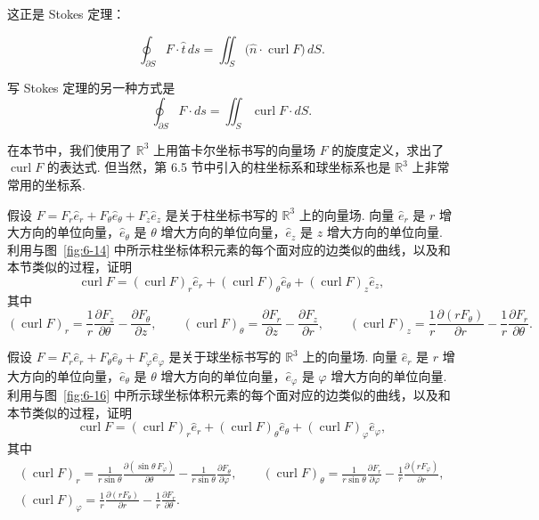 这正是 Stokes 定理：
\begin{theorem}[Stokes 定理]\label{thm:9-4}
\[
\oint_{\partial S}F\cdot\hat{t}\,ds=\iint_S\bigl(\hat{n}\cdot\operatorname{curl}F\bigr)\,dS.
\]
\end{theorem}

写 Stokes 定理的另一种方式是
\[
\oint_{\partial S}F\cdot ds=\iint_S\operatorname{curl}F\cdot dS.
\]

在本节中，我们使用了 $\mathbb{R}^3$ 上用笛卡尔坐标书写的向量场 $F$ 的旋度定义，求出了 $\operatorname{curl}F$ 的表达式. 但当然，第 6.5 节中引入的柱坐标系和球坐标系也是 $\mathbb{R}^3$ 上非常常用的坐标系.

\begin{question}\label{q:9-7}
假设 $F=F_r\hat{e}_r+F_\theta\hat{e}_\theta+F_z\hat{e}_z$ 是关于柱坐标书写的 $\mathbb{R}^3$ 上的向量场. 向量 $\hat{e}_r$ 是 $r$ 增大方向的单位向量，$\hat{e}_\theta$ 是 $\theta$ 增大方向的单位向量，$\hat{e}_z$ 是 $z$ 增大方向的单位向量. 利用与图~\ref{fig:6-14} 中所示柱坐标体积元素的每个面对应的边类似的曲线，以及和本节类似的过程，证明
\[
\operatorname{curl}F=(\operatorname{curl}F)_r\hat{e}_r+(\operatorname{curl}F)_\theta\hat{e}_\theta+(\operatorname{curl}F)_z\hat{e}_z,
\]
其中
\[
(\operatorname{curl}F)_r=\frac{1}{r}\frac{\partial F_z}{\partial\theta}-\frac{\partial F_\theta}{\partial z},\qquad
(\operatorname{curl}F)_\theta=\frac{\partial F_r}{\partial z}-\frac{\partial F_z}{\partial r},\qquad
(\operatorname{curl}F)_z=\frac{1}{r}\frac{\partial(rF_\theta)}{\partial r}-\frac{1}{r}\frac{\partial F_r}{\partial\theta}.
\]
\end{question}

\begin{question}\label{q:9-8}
假设 $F=F_r\hat{e}_r+F_\theta\hat{e}_\theta+F_\varphi\hat{e}_\varphi$ 是关于球坐标书写的 $\mathbb{R}^3$ 上的向量场. 向量 $\hat{e}_r$ 是 $r$ 增大方向的单位向量，$\hat{e}_\theta$ 是 $\theta$ 增大方向的单位向量，$\hat{e}_\varphi$ 是 $\varphi$ 增大方向的单位向量. 利用与图~\ref{fig:6-16} 中所示球坐标体积元素的每个面对应的边类似的曲线，以及和本节类似的过程，证明
\[
\operatorname{curl}F=(\operatorname{curl}F)_r\hat{e}_r+(\operatorname{curl}F)_\theta\hat{e}_\theta+(\operatorname{curl}F)_\varphi\hat{e}_\varphi,
\]
其中
\begin{align*}
(\operatorname{curl}F)_r=\frac{1}{r\sin\theta}\frac{\partial(\sin\theta\,F_\varphi)}{\partial\theta}-\frac{1}{r\sin\theta}\frac{\partial F_\theta}{\partial\varphi},\qquad
(\operatorname{curl}F)_\theta=\frac{1}{r\sin\theta}\frac{\partial F_r}{\partial\varphi}-\frac{1}{r}\frac{\partial(rF_\varphi)}{\partial r}, \\
(\operatorname{curl}F)_\varphi=\frac{1}{r}\frac{\partial(rF_\theta)}{\partial r}-\frac{1}{r}\frac{\partial F_r}{\partial\theta}.
\end{align*}
\end{question}

